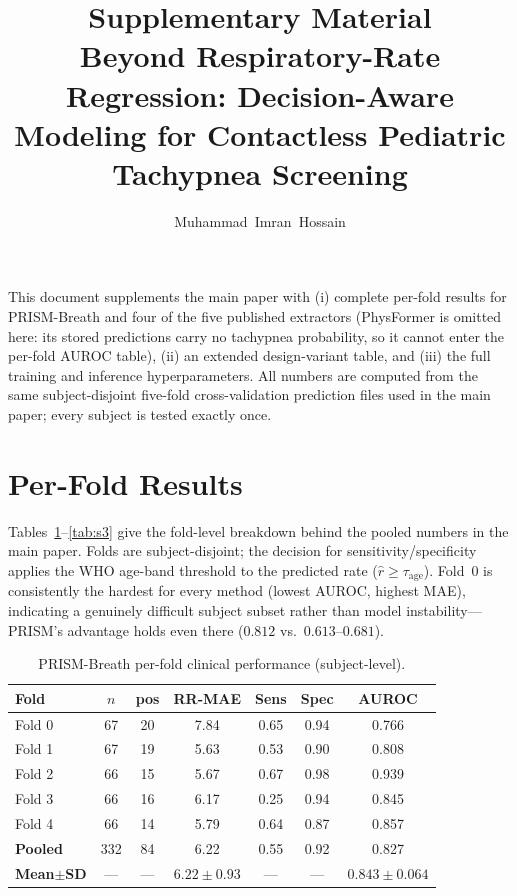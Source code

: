 \documentclass[journal]{IEEEtran}
\begin{document}
\title{Supplementary Material\\ Beyond Respiratory-Rate Regression: Decision-Aware Modeling for
Contactless Pediatric Tachypnea Screening}
\author{Muhammad~Imran~Hossain}
\maketitle

\noindent This document supplements the main paper with (i) complete per-fold results for
PRISM-Breath and four of the five published extractors (PhysFormer is omitted here: its stored predictions carry no tachypnea probability, so it cannot enter the per-fold AUROC table), (ii) an extended design-variant table, and (iii) the
full training and inference hyperparameters. All numbers are computed from the same subject-disjoint
five-fold cross-validation prediction files used in the main paper; every subject is tested exactly once.

\section{Per-Fold Results}
Tables~\ref{tab:s1}--\ref{tab:s3} give the fold-level breakdown behind the pooled numbers in the main
paper. Folds are subject-disjoint; the decision for sensitivity/specificity applies the WHO age-band
threshold to the predicted rate ($\hat r \ge \tau_{\text{age}}$). Fold~0 is consistently the hardest for
every method (lowest AUROC, highest MAE), indicating a genuinely difficult subject subset rather than
model instability---PRISM's advantage holds even there ($0.812$ vs.\ $0.613$--$0.681$).

\begin{table}[!t]
\caption{PRISM-Breath per-fold clinical performance (subject-level).}
\label{tab:s1}\centering\small
\setlength{\tabcolsep}{4pt}
\begin{tabular}{@{}lcccccc@{}}\toprule
Fold & $n$ & pos & RR-MAE & Sens & Spec & AUROC\\\midrule
Fold 0 & 67 & 20 & 7.84 & 0.65 & 0.94 & 0.766 \\
Fold 1 & 67 & 19 & 5.63 & 0.53 & 0.90 & 0.808 \\
Fold 2 & 66 & 15 & 5.67 & 0.67 & 0.98 & 0.939 \\
Fold 3 & 66 & 16 & 6.17 & 0.25 & 0.94 & 0.845 \\
Fold 4 & 66 & 14 & 5.79 & 0.64 & 0.87 & 0.857 \\
\midrule
\textbf{Pooled} & 332 & 84 & 6.22 & 0.55 & 0.92 & 0.827 \\
\textbf{Mean$\pm$SD} & --- & --- & $6.22{\pm}0.93$ & --- & --- & $0.843{\pm}0.064$ \\
\bottomrule
\end{tabular}
\end{table}
\end{document}

